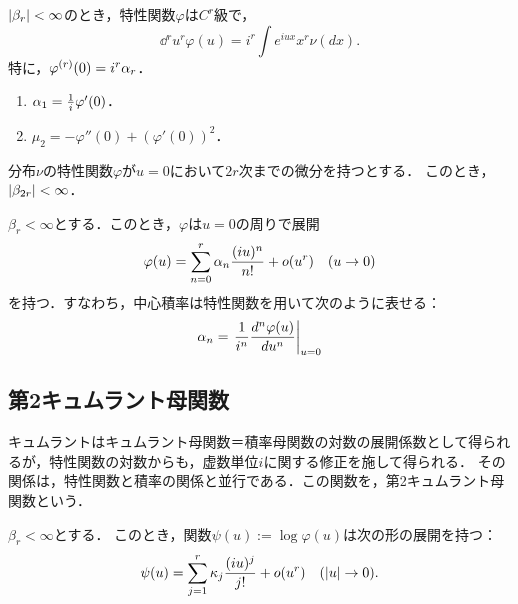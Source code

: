 \documentclass[uplatex,dvipdfmx]{jsreport}
\begin{document}
\begin{proposition}
    $\lvert\beta_r\rvert<\infty$のとき，特性関数$\varphi$は$C^r$級で，
    \[\dd{^r}{u^r}\varphi(u)=i^r\int e^{iux}x^r\nu(dx).\]
    特に，$\varphi^{(r)}(0)=i^r\alpha_r$．
\end{proposition}

\begin{corollary}[平均と分散の特性関数による特徴付け]\mbox{}\label{cor-mean-and-variance-in-terms-of-characteristic-function}
    \begin{enumerate}
        \item $\alpha_1=\frac{1}{i}\varphi'(0)$．
        \item $\mu_2=-\varphi''(0)+(\varphi'(0))^2$．
    \end{enumerate}
\end{corollary}

\begin{proposition}
    分布$\nu$の特性関数$\varphi$が$u=0$において$2r$次までの微分を持つとする．
    このとき，$\lvert\beta_{2r}\rvert<\infty$．
\end{proposition}

\begin{proposition}[特性関数のTaylor展開係数からの積率の計算]
    $\beta_r<\infty$とする．このとき，$\varphi$は$u=0$の周りで展開
    \[\varphi(u)=\sum^r_{n=0}\alpha_n\frac{(iu)^n}{n!}+o(u^r)\quad(u\to0)\]
    を持つ．すなわち，中心積率は特性関数を用いて次のように表せる：
    \[\alpha_n=\left.\frac{1}{i^n}\frac{d ^n\varphi(u)}{d u^n}\right|_{u=0}\]
\end{proposition}

\subsection{第2キュムラント母関数}

\begin{tcolorbox}[colframe=ForestGreen, colback=ForestGreen!10!white,breakable,colbacktitle=ForestGreen!40!white,coltitle=black,fonttitle=\bfseries\sffamily,
title=]
    キュムラントはキュムラント母関数＝積率母関数の対数の展開係数として得られるが，特性関数の対数からも，虚数単位$i$に関する修正を施して得られる．
    その関係は，特性関数と積率の関係と並行である．この関数を，第2キュムラント母関数という．
\end{tcolorbox}

\begin{proposition}
    $\beta_r<\infty$とする．
    このとき，関数$\psi(u):=\log\varphi(u)$は次の形の展開を持つ：
    \[\psi(u)=\sum^r_{j=1}\kappa_j\frac{(iu)^j}{j!}+o(u^r)\quad(\lvert u\rvert\to0).\]
\end{proposition}
\end{document}
